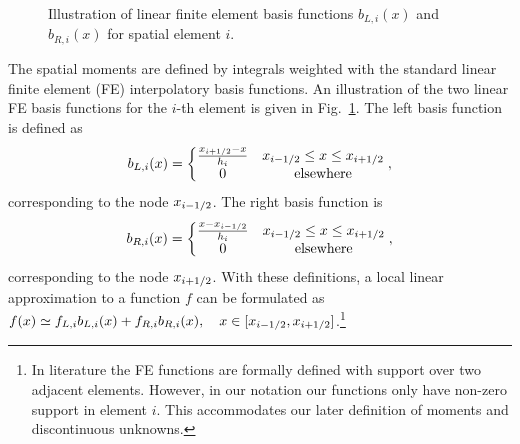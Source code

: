 \begin{figure}[H]
    \centering
    \begin{centering}
    \end{centering}
    \caption{Illustration of linear finite element basis functions $b_{L,i}(x)$ and
    $b_{R,i}(x)$ for spatial element $i$.\label{fig:lin_fe}}
\end{figure}

The spatial moments are defined by integrals weighted with the standard linear finite element (FE)
interpolatory basis functions.  An illustration of the two linear FE basis functions for the $i$-th element is
given in Fig.~\ref{fig:lin_fe}.  The left basis function is defined as
\begin{equation}
    b_{L,i}(x)= \left\{\begin{matrix} \frac{x_{{i+1/2}} - x}{h_i} & x_{{i-1/2}} \leq x \leq x_{{i+1/2}}
        \\ 0 &  \text{elsewhere}
    \end{matrix}\right.,
\end{equation}
corresponding to the node $x_{{i-1/2}}$.
The right basis function is 
\begin{equation}
    b_{R,i}(x)= \left\{\begin{matrix} \frac{x - x_{{i-1/2}}}{h_i} & x_{{i-1/2}} \leq x \leq x_{{i+1/2}}
        \\ 0 & \text{elsewhere}
    \end{matrix}\right. ,
\end{equation}
corresponding to the node $x_{{i+1/2}}$. With these definitions, a local linear approximation to a
function $f$ can be formulated as $f(x)\simeq f_{L,i} b_{L,i}(x) + f_{R,i}
b_{R,i}(x),\quad x\in[x_{{i-1/2}},x_{{i+1/2}}]$.\footnote{In literature the FE functions are
formally defined with support over two adjacent elements.  However, in our notation our 
functions only have non-zero support in element $i$. This accommodates our later
definition of moments and discontinuous unknowns.}

